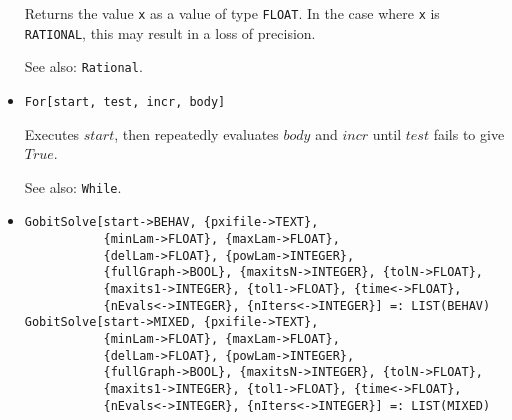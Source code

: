 \begin{itemize}
\bd
Returns the value \verb+x+ as a value of type {\tt FLOAT}.
In the case where \verb+x+ is {\tt RATIONAL}, this may result in a loss
of precision.
\item
[See also:] {\tt Rational}.
\ed

\item
\protect \large \begin{verbatim}
For[start, test, incr, body]
\end{verbatim}\normalsize

\bd
Executes $start$, then repeatedly evaluates $body$ and $incr$
until $test$ fails to give $True$.
\item
[See also:] \verb+While+.
\ed


\item
\protect \large \begin{verbatim}
GobitSolve[start->BEHAV, {pxifile->TEXT},
           {minLam->FLOAT}, {maxLam->FLOAT},
           {delLam->FLOAT}, {powLam->INTEGER},
           {fullGraph->BOOL}, {maxitsN->INTEGER}, {tolN->FLOAT},
           {maxits1->INTEGER}, {tol1->FLOAT}, {time<->FLOAT},
           {nEvals<->INTEGER}, {nIters<->INTEGER}] =: LIST(BEHAV)
GobitSolve[start->MIXED, {pxifile->TEXT},
           {minLam->FLOAT}, {maxLam->FLOAT},
           {delLam->FLOAT}, {powLam->INTEGER},
           {fullGraph->BOOL}, {maxitsN->INTEGER}, {tolN->FLOAT},
           {maxits1->INTEGER}, {tol1->FLOAT}, {time<->FLOAT},
           {nEvals<->INTEGER}, {nIters<->INTEGER}] =: LIST(MIXED)
\end{verbatim}\normalsize


\end{itemize}
